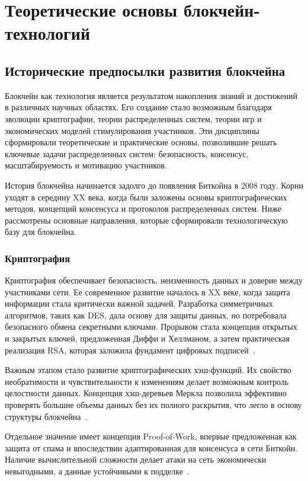 \chapter{Теоретические основы блокчейн-технологий}\label{ch:ch1}

\section{Исторические предпосылки развития блокчейна}\label{sec:ch1/sec1}

Блокчейн как технология является результатом накопления знаний и достижений в
различных научных областях. Его создание стало возможным благодаря эволюции
криптографии, теории распределенных систем, теории игр и экономических моделей
стимулирования участников. Эти дисциплины сформировали теоретические и
практические основы, позволившие решать ключевые задачи распределенных систем:
безопасность, консенсус, масштабируемость и мотивацию участников.

История блокчейна начинается задолго до появления Биткойна в 2008 году. Корни
уходят в середину XX века, когда были заложены основы криптографических методов,
концепций консенсуса и протоколов распределенных систем. Ниже рассмотрены
основные направления, которые сформировали технологическую базу для блокчейна.

\subsection{Криптография}\label{sec:ch1/sec1/crypto}

Криптография обеспечивает безопасность, неизменность данных и доверие между
участниками сети. Ее современное развитие началось в XX веке, когда защита
информации стала критически важной задачей. Разработка симметричных алгоритмов,
таких как DES, дала основу для защиты данных, но потребовала безопасного обмена
секретными ключами. Прорывом стала концепция открытых и закрытых ключей,
предложенная Диффи и Хеллманом, а затем практическая реализация RSA, которая
заложила фундамент цифровых подписей~\cite{DiffieHellman1976,Johnson1994}.

Важным этапом стало развитие криптографических хэш-функций. Их свойство
необратимости и чувствительности к изменениям делает возможным контроль
целостности данных. Концепция хэш-деревьев Меркла позволила эффективно проверять
большие объемы данных без их полного раскрытия, что легло в основу структуры
блокчейна~\cite{Merkle1980}.

Отдельное значение имеет концепция Proof-of-Work, впервые предложенная как защита
от спама и впоследствии адаптированная для консенсуса в сети Биткойн. Наличие
вычислительной сложности делает атаки на сеть экономически невыгодными, а данные
устойчивыми к подделке~\cite{Back2002,Nakamoto2008}.

